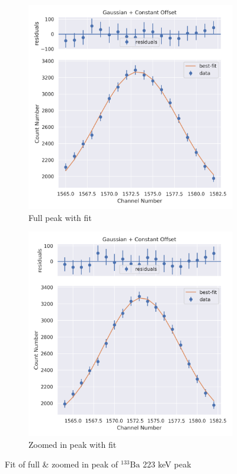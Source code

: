 \documentclass[11pt,a4paper]{article}
\newcommand{\element}[2]{$^{#2}\textrm{#1}$}
\begin{document}
\begin{figure}[H]
  \centering
  \begin{subfigure}{.5\linewidth}
    \centering
    \includegraphics[width=\linewidth]{./Images/Barium133/Gauss/Gauss_3_Full.png}
    \caption{Full peak with fit}
  \end{subfigure}%
  \begin{subfigure}{.5\linewidth}
    \centering
    \includegraphics[width=\linewidth]{./Images/Barium133/Gauss/Gauss_3_Zoom.png}
    \caption{Zoomed in peak with fit}
  \end{subfigure}
  \caption{Fit of full \& zoomed in peak of \element{Ba}{133} 223 keV peak}
\end{figure}
\end{document}
